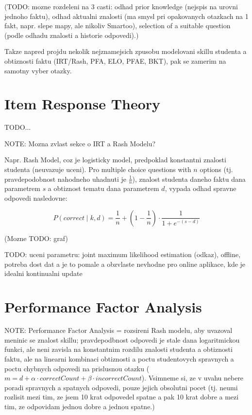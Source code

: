 \documentclass[a4paper, 12pt, twoside]{fithesis2}		%
\renewcommand{\_}{\leavevmode \kern0.0em\vbox{\hrule width0.4em}}
\newcounter{choice}
\begin{document}
(TODO: mozne rozdeleni na 3 casti: odhad prior knowledge (nejspis na urovni jednoho faktu), odhad aktualni znalosti (ma smysl pri opakovanych otazkach na 1 fakt, napr. slepe mapy, ale nikoliv Smartoo), selection of a suitable question (podle odhadu znalosti a historie odpovedi).)


Takze napred projdu nekolik nejznamejsich zpusobu modelovani skillu studenta a obtiznosti faktu (IRT/Rash, PFA, ELO, PFAE, BKT), pak se zamerim na samotny vyber otazky.


\section{Item Response Theory}
\label{sec:irt}


TODO...

NOTE: Mozna zvlast sekce o IRT a Rash Modelu?

Napr. Rash Model, coz je logisticky model, predpoklad konstantni znalosti studenta (neuvazuje uceni). Pro multiple choice questions with $n$ options (tj. pravdepodobnost nahodneho uhadnuti je $\frac{1}{n}$), znalost studenta daneho faktu dana parametrem $s$ a obtiznost tematu dana parametrem $d$, vypada odhad spravne odpovedi nasledovne:

$$
P(correct \mid k, d) = \frac{1}{n} + \left( 1 - \frac{1}{n} \right) \cdot \frac{1}{1 + e^{-(s - d)}}
$$

(Mozne TODO: graf)

TODO: uceni parametru: joint maximum likelihood estimation (odkaz), offline, potreba dost dat a je to pomale a obzvlaste nevhodne pro online aplikace, kde je idealni kontinualni update


\section{Performance Factor Analysis}
\label{sec:pfa}

NOTE: Performance Factor Analysis = rozsireni Rash modelu, aby uvazoval meninic se znalost skillu; pravdepodbnost odpovedi je stale dana logaritmickou funkci, ale neni zavisla na konstantnim rozdilu znalosti studenta a obtiznosti faktu, ale na linearni kombinaci obtiznosti a poctu studentovych spravnych a poctu chybnych odpovedi na prislusnou otazku ($m = d + \alpha \cdot correctCount + \beta \cdot incorrectCount$).
Vsimneme si, ze v uvahu nebere poradi spravnych a spatnych odpovedi, pouze jejich obsolutni pocet (tj. neumi rozlisit mezi tim, ze jsem 10 krat odpovedel spatne a pak 10 krat dobre a mezi tim, ze odpovidam jednou dobre a jednou spatne.)
\end{document}
